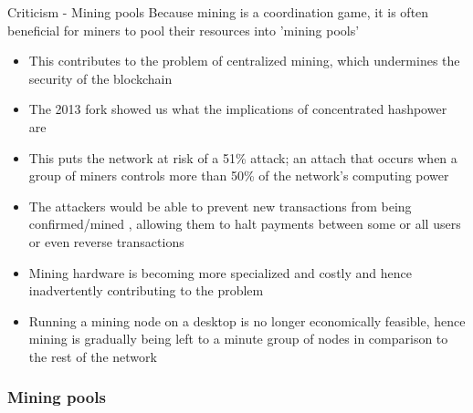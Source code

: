 \documentclass[11pt]{beamer}
\begin{document}


\begin{frame}{Criticism - Mining pools}
	Because mining is a coordination game, it is often beneficial for miners to pool their resources into 'mining pools'
	\begin{itemize}
		\item This contributes to the problem of centralized mining, which undermines the security of the blockchain
		\item The 2013 fork showed us what the implications of concentrated hashpower are
		\item This puts the network at risk of a 51\% attack; an attach that occurs when a group of miners controls more than 50\% of the network's computing power
		\item The attackers would be able to prevent new transactions from being confirmed/mined , allowing them to halt payments between some or all users or even reverse transactions
		\item Mining hardware is becoming more specialized and costly and hence inadvertently contributing to the problem
		\item Running a mining node on a desktop is no longer economically feasible, hence mining is gradually being left to a minute group of nodes in comparison to the rest of the network
	\end{itemize}
\end{frame}

\subsubsection{Mining pools}
\end{document}
